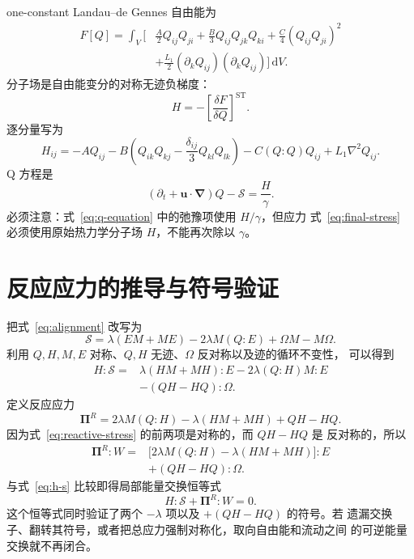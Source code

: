 \documentclass[UTF8,11pt,a4paper]{ctexart}
\newcommand{\ST}{\operatorname{ST}}
\newcommand{\dd}{\,\mathrm d}
\newcommand{\pireac}{\bm{\Pi}^{R}}
\begin{document}
one-constant Landau--de Gennes 自由能为
\begin{equation}
\begin{aligned}
F[Q]=\int_V \bigg[&
\frac{A}{2}Q_{ij}Q_{ji}
+\frac{B}{3}Q_{ij}Q_{jk}Q_{ki}
+\frac{C}{4}(Q_{ij}Q_{ji})^2\\
&+\frac{L_1}{2}(\partial_kQ_{ij})(\partial_kQ_{ij})
\bigg]\dd V.
\end{aligned}
\label{eq:free-energy}
\end{equation}
分子场是自由能变分的对称无迹负梯度：
\begin{equation}
  H=-\left[\frac{\delta F}{\delta Q}\right]^{\ST}.
\end{equation}
逐分量写为
\begin{equation}
\boxed{
H_{ij}=-AQ_{ij}
-B\left(Q_{ik}Q_{kj}-\frac{\delta_{ij}}{3}Q_{kl}Q_{lk}\right)
-C(Q:Q)Q_{ij}
+L_1\nabla^2Q_{ij}.
}
\label{eq:molecular-field}
\end{equation}
Q 方程是
\begin{equation}
  (\partial_t+\bm u\!\cdot\!\bm\nabla)Q-\mathcal S
  =\frac{H}{\gamma}.
  \label{eq:q-equation}
\end{equation}
必须注意：式~\eqref{eq:q-equation} 中的弛豫项使用 $H/\gamma$，但应力
式~\eqref{eq:final-stress} 必须使用原始热力学分子场 $H$，不能再次除以
$\gamma$。

\section{反应应力的推导与符号验证}

把式~\eqref{eq:alignment} 改写为
\begin{equation}
  \mathcal S
  =\lambda(EM+ME)-2\lambda M(Q:E)+\Omega M-M\Omega.
\end{equation}
利用 $Q,H,M,E$ 对称、$Q,H$ 无迹、$\Omega$ 反对称以及迹的循环不变性，
可以得到
\begin{equation}
\begin{aligned}
H:\mathcal S={}&
\lambda(HM+MH):E
-2\lambda(Q:H)M:E\\
&-(QH-HQ):\Omega.
\end{aligned}
\label{eq:h-s}
\end{equation}
定义反应应力
\begin{equation}
\boxed{
  \pireac
  =2\lambda M(Q:H)-\lambda(HM+MH)+QH-HQ.
}
\label{eq:reactive-stress}
\end{equation}
因为式~\eqref{eq:reactive-stress} 的前两项是对称的，而 $QH-HQ$ 是
反对称的，所以
\begin{equation}
\begin{aligned}
\pireac:W={}&
\bigl[2\lambda M(Q:H)-\lambda(HM+MH)\bigr]:E\\
&+(QH-HQ):\Omega.
\end{aligned}
\end{equation}
与式~\eqref{eq:h-s} 比较即得局部能量交换恒等式
\begin{equation}
\boxed{H:\mathcal S+\pireac:W=0.}
\label{eq:local-energy-pairing}
\end{equation}
这个恒等式同时验证了两个 $-\lambda$ 项以及 $+(QH-HQ)$ 的符号。若
遗漏交换子、翻转其符号，或者把总应力强制对称化，取向自由能和流动之间
的可逆能量交换就不再闭合。
\end{document}
